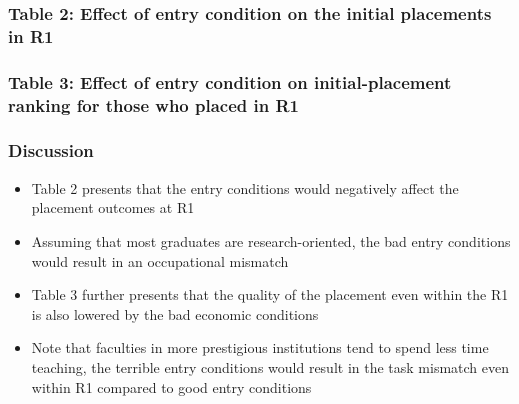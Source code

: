 \documentclass[10pt,svgnames,fragile]{beamer}
\begin{document}




{
\begin{frame}
	\frametitle{Table 2: Effect of entry condition on the initial placements in R1}
	
\end{frame}}

{
\begin{frame}
	\frametitle{Table 3: Effect of entry condition on  initial-placement ranking   for those who placed in R1}
	
\end{frame}}


\begin{frame}
	\frametitle{Discussion}
	\begin{itemize}
		\item Table 2 presents that the entry conditions would negatively affect the placement outcomes at R1
		\vspace{2 mm}
		\item Assuming that most graduates are research-oriented, the bad entry conditions would result in an occupational mismatch
		\vspace{2 mm}
		\item Table 3 further presents that the quality of the placement even within the R1 is also lowered by the bad economic conditions
		\vspace{2 mm}
		\item Note that faculties in more prestigious institutions tend to spend less time teaching, the terrible entry conditions would result in the task mismatch even within R1 compared to good entry conditions
		\vspace{2 mm}
	\end{itemize}
\end{frame}
\end{document}
